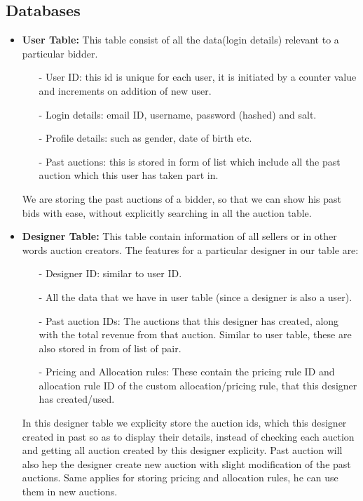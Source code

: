 \documentclass[a4paper]{article}
\begin{document}
\subsection*{Databases}
\begin{itemize}
    \item \textbf{User Table:} This table consist of all the data(login details) relevant to a particular bidder.
    \begin{itemize}
        \item[-] User ID: this id is unique for each user, it is initiated by a counter value and increments on addition of new user.
        \item[-] Login details: email ID, username, password (hashed) and salt.
        \item[-] Profile details: such as gender, date of birth etc.
        \item[-] Past auctions: this is stored in form of list which include all the past auction which this user has taken part in.

    \end{itemize}
    We are storing the past auctions of a bidder, so that we can show his past bids with ease, without explicitly searching in all the auction table.

    \item \textbf{Designer Table:} This table contain information of all sellers or in other words auction creators. The features for a particular designer in our table are:
    \begin{itemize}
        \item[-] Designer ID: similar to user ID.
        \item[-] All the data that we have in user table (since a designer is also a user).
        \item[-] Past auction IDs: The auctions that this designer has created, along with the total revenue from that auction. Similar to user table, these are also stored in from of list of pair.
        \item[-] Pricing and Allocation rules: These contain the pricing rule ID and allocation rule ID of the custom allocation/pricing rule, that this designer has created/used.
    \end{itemize}
    In this designer table we explicity store the auction ids, which this designer created in past so as to display their details, instead of checking each auction and getting all auction created by this designer explicity. Past auction will also hep the designer create new auction with slight modification of the past auctions. Same applies for storing pricing and allocation rules, he can use them in new auctions.


\end{itemize}
\end{document}

